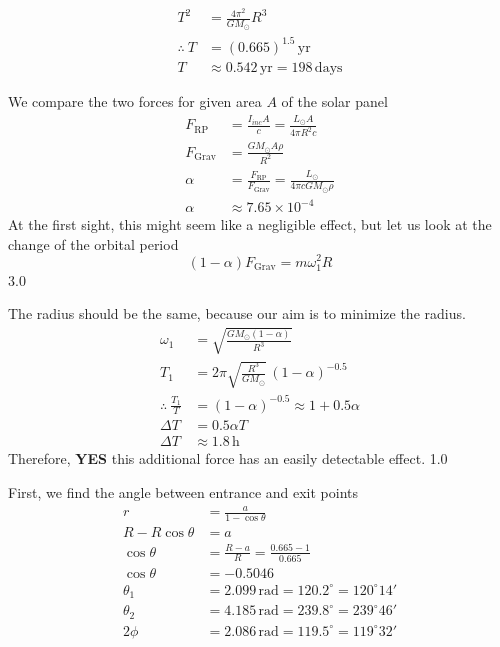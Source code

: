 \begin{description}
\begin{align*}
  T^2 &= \frac{4\pi^2}{GM_\odot}R^3\\
  \therefore\ T &= (0.665)^{1.5}\,\mathrm{yr}\\
  T &\approx 0.542\,\mathrm{yr} = 198\,\mathrm{days}
    \tag*{3.0}
  \end{align*}
\item[(g)] We compare the two forces for given area $A$ of the solar panel
  \begin{align*}
  F_{\mathrm{RP}} &= \frac{I_{inc}A}{c} = \frac{L_\odot A}{4\pi R^2 c}
    \tag*{2.0}\\
  F_{\mathrm{Grav}} &= \frac{GM_\odot A\rho}{R^2}
    \tag*{1.0}\\
  \alpha &= \frac{F_{\mathrm{RP}}}{F_{\mathrm{Grav}}}
    = \frac{L_\odot}{4\pi cGM_\odot\rho}\\
  \alpha &\approx 7.65\times10^{-4}
    \tag*{2.0}
  \end{align*}
  At the first sight, this might seem like a negligible effect, but let us
  look at the change of the orbital period
  \[ (1-\alpha)F_{\mathrm{Grav}} = m\omega_1^2 R \]
  \hfill 3.0

  The radius should be the same, because our aim is to minimize the radius.
  \begin{align*}
  \omega_1 &= \sqrt{\frac{GM_\odot(1-\alpha)}{R^3}}\\
  T_1 &= 2\pi\sqrt{\frac{R^3}{GM_\odot}}\,(1-\alpha)^{-0.5}
    \tag*{1.0}\\
  \therefore\ \frac{T_1}{T} &= (1-\alpha)^{-0.5} \approx 1 + 0.5\alpha\\
  \Delta T &= 0.5\alpha T\\
  \Delta T &\approx 1.8\,\mathrm{h}
    \tag*{3.0}
  \end{align*}
  Therefore, \textbf{YES} this additional force has an easily detectable
  effect. \hfill 1.0
\item[(h)] First, we find the angle between entrance and exit points
  \begin{align*}
  r &= \frac{a}{1-\cos\theta}\\
  R - R\cos\theta &= a\\
  \cos\theta &= \frac{R-a}{R} = \frac{0.665-1}{0.665}
    \tag*{1.0}\\
  \cos\theta &= -0.5046
    \tag*{1.0}\\
  \theta_1 &= 2.099\,\mathrm{rad} = 120.2^\circ = 120^\circ14'\\
  \theta_2 &= 4.185\,\mathrm{rad} = 239.8^\circ = 239^\circ46'\\
  2\phi &= 2.086\,\mathrm{rad} = 119.5^\circ = 119^\circ32'
    \tag*{3.0}
  \end{align*}


\end{description}
